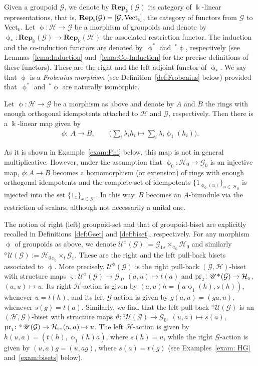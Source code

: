 \documentclass[pdftex]{sigma}
\numberwithin{equation}{section}
\newcommand{\Rep}[1]{\mathbf{Rep}_{\Sscript{\Bbbk}}(#1)}
\newcommand{\Vect}{{\rm Vect}_{\Sscript{\Bbbk}}}
\newcommand{\Go}{\cG_{\Sscript{0}}}
\newcommand{\Ga}{\cG_{\Sscript{1}}}
\newcommand{\Ho}{\cH_{\Sscript{0}}}
\newcommand{\uU}{\mathscr{U}}
\newcommand{\cG}{{\mathcal G}}
\newcommand{\cH}{{\mathcal H}}
\newcommand{\Sscript}[1]{\scriptscriptstyle{#1}}
\newcommand{\due}[3]{{}_{{#2 }} {#1}_{{ #3}} }
\newcommand{\upg}{\uU^{\Sscript{\upphi}}(\cG)}
\newcommand{\pug}{{}^{\Sscript{\upphi}}\uU(\cG)}
\newcommand{\phio}{\upphi_{\Sscript{0}}}
\newcommand{\phia}{\upphi_{\Sscript{1}}}
\begin{document}
Given a groupoid $\cG$, we denote by $\Rep{\cG}$ its category of $\Bbbk$-linear representations, that is, $\Rep{\cG}=[\cG, \Vect]$, the category of functors from $\cG$ to $\Vect$. Let $\upphi \colon \cH \to \cG$ be a morphism of groupoids and denote by $\upphi_{\Sscript{*}}\colon \Rep{\cG} \to \Rep{\cH}$ the associated restriction functor. The induction and the co-induction functors are denoted by~$\upphi^{*}$ and~${}^{*}\upphi$, respectively (see Lemmas~\ref{lema:Induction} and~\ref{lema:Co-Induction} for the precise definitions of these functors). These are the right and the left adjoint functor of $\upphi_{\Sscript{*}}$. We say that $\upphi$ is a \emph{Frobenius morphism} (see Definition~\ref{def:Frobenius} below) provided that~$\upphi^{*}$ and~${}^{*}\upphi$ are naturally isomorphic.

 Let $\upphi\colon \cH \to \cG$ be a morphism as above and denote by $A$ and $B$ the rings with enough orthogonal idempotents attached to $\cH$ and $\cG$, respectively. Then there is a $\Bbbk$-linear map given by
\begin{gather}\label{Eq:phi}
\phi\colon \ A \longrightarrow B, \qquad \bigg( \sum_i \lambda_i h_i \longmapsto \sum_i \lambda_i \phia(h_i)\bigg).
\end{gather}

As it is shown in Example~\ref{exam:Phi} below, this map is not in general multiplicative. However, under the assumption that $\phio\colon \Ho \to \Go$ is an injective map, $\phi\colon A \to B$ becomes a homomorphism (or extension) of rings with enough orthogonal idempotents and the complete set of idempotents $\{1_{\Sscript{\phio(u)}}\}_{u \in \Ho}$ is injected into the set $\{1_{\Sscript{x}}\}_{x \in \Go}$. In this way, $B$ becomes an $A$-bimodule via the restriction of scalars, although not necessarily a unital one.

The notion of right (left) groupoid-set and that of groupoid-biset are explicitly recalled in Definitions~\ref{def:Gset} and \ref{def:biset}, respectively. For any morphism $\upphi$ of groupoids as above, we denote $\upg:=\Ga \due \times {\Sscript{s}}{ \Sscript{\upphi_0} } \Ho$ and similarly ${ }^{\Sscript{\upphi}}\uU(\cG):=\Ho \due \times{\Sscript{\upphi_0}}{ \Sscript{t}} \Ga$. These are the right and the left pull-back bisets associated to $\upphi$. More precisely, $\upg$ is the right pull-back $(\cG,\cH)$-biset with structure maps $\varsigma\colon \upg \to \Go$, $(a,u) \mapsto t(a)$ and ${\rm pr}_{\Sscript{2}}\colon \upg \to \Ho$, $(a,u) \mapsto u$. Its right $\cH$-action is given by $(a,u) h= (a\phia(h), s(h))$, whenever $u=t(h)$, and its left $\cG$-action is given by $g(a,u)=(ga,u)$, whenever $s(g)=t(a)$. Similarly, we find that the left pull-back ${ }^{\Sscript{\upphi}}\uU(\cG)$ is an $(\cH,\cG)$-biset with structure maps $\vartheta\colon {}^{\Sscript{\upphi}}\uU(\cG) \to \Go$, $(u,a) \mapsto s(a)$, ${\rm pr}_{\Sscript{1}}\colon \pug \to \Ho, (u,a) \mapsto u$. The left $\cH$-action is given by $h (u,a)=(t(h), \phia(h)a)$, where $s(h)=u$, while the right $\cG$-action is given by $(u,a) g=(u,ag)$, where $s(a)=t(g)$ (see Examples~\ref{exam: HG} and~\ref{exam:bisets} below).
\end{document}

